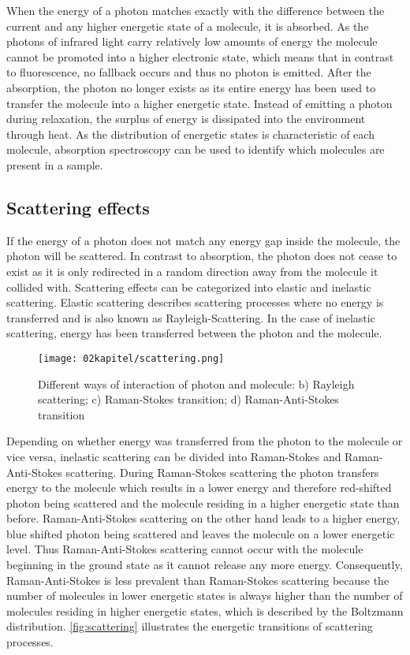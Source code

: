 When the energy of a photon matches exactly with the difference between the current and any higher energetic state of a molecule, it is absorbed. As the photons of infrared light carry relatively low amounts of energy the molecule cannot be promoted into a higher electronic state, which means that in contrast to fluorescence, no fallback occurs and thus no photon is emitted. After the absorption, the photon no longer exists as its entire energy has been used to transfer the molecule into a higher energetic state. Instead of emitting a photon during relaxation, the surplus of energy is dissipated into the environment through heat. As the distribution of energetic states is characteristic of each molecule, absorption spectroscopy can be used to identify which molecules are present in a sample.

\subsection{Scattering effects}

If the energy of a photon does not match any energy gap inside the molecule, the photon will be scattered. In contrast to absorption, the photon does not cease to exist as it is only redirected in a random direction away from the molecule it collided with. Scattering effects can be categorized into elastic and inelastic scattering. Elastic scattering describes scattering processes where no energy is transferred and is also known as Rayleigh-Scattering. In the case of inelastic scattering, energy has been transferred between the photon and the molecule.

\begin{figure}[!htb]
    \centering
    \texttt{[image: 02kapitel/scattering.png]}
    \caption[Energy diagrams of scattering events]{Different ways of interaction of photon and molecule: b) Rayleigh scattering; c) Raman-Stokes transition; d) Raman-Anti-Stokes transition \autocite{brauerApplicationRamanSpectroscopy2022}}
    \label{fig:scattering}
\end{figure}

Depending on whether energy was transferred from the photon to the molecule or vice versa, inelastic scattering can be divided into Raman-Stokes and Raman-Anti-Stokes scattering. During Raman-Stokes scattering the photon transfers energy to the molecule which results in a lower energy and therefore red-shifted photon being scattered and the molecule residing in a higher energetic state than before. Raman-Anti-Stokes scattering on the other hand leads to a higher energy, blue shifted photon being scattered and leaves the molecule on a lower energetic level. Thus Raman-Anti-Stokes scattering cannot occur with the molecule beginning in the ground state as it cannot release any more energy. Consequently, Raman-Anti-Stokes is less prevalent than Raman-Stokes scattering because the number of molecules in lower energetic states is always higher than the number of molecules residing in higher energetic states, which is described by the Boltzmann distribution. \autoref{fig:scattering} illustrates the energetic transitions of scattering processes.


